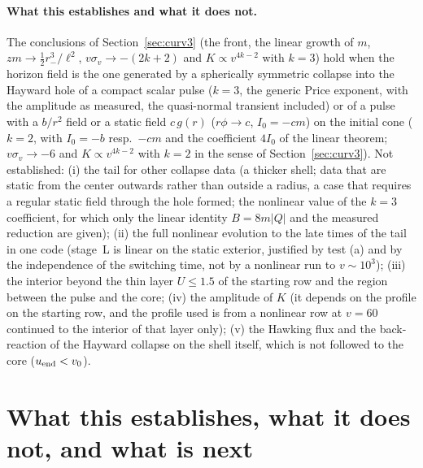 \documentclass[11pt]{article}
\begin{document}
\paragraph{What this establishes and what it does not.} The conclusions of Section~\ref{sec:curv3} (the front, the linear growth of $m$, $zm\to\tfrac12r_-^{3}/\ell^{2}$, $v\sigma_v\to-(2k+2)$ and $K\propto v^{4k-2}$ with $k=3$) hold when the horizon field is the one generated by a spherically symmetric collapse into the Hayward hole of a compact scalar pulse ($k=3$, the generic Price exponent, with the amplitude as measured, the quasi-normal transient included) or of a pulse with a $b/r^{2}$ field or a static field $c\,g(r)$ ($r\phi\to c$, $I_0=-cm$) on the initial cone ($k=2$, with $I_0=-b$ resp.\ $-cm$ and the coefficient $4I_0$ of the linear theorem; $v\sigma_v\to-6$ and $K\propto v^{4k-2}$ with $k=2$ in the sense of Section~\ref{sec:curv3}). Not established: (i) the tail for other collapse data (a thicker shell; data that are static from the center outwards rather than outside a radius, a case that requires a regular static field through the hole formed; the nonlinear value of the $k=3$ coefficient, for which only the linear identity $B=8m|Q|$ and the measured reduction are given); (ii) the full nonlinear evolution to the late times of the tail in one code (stage~L is linear on the static exterior, justified by test (a) and by the independence of the switching time, not by a nonlinear run to $v\sim10^{3}$); (iii) the interior beyond the thin layer $U\le1.5$ of the starting row and the region between the pulse and the core; (iv) the amplitude of $K$ (it depends on the profile on the starting row, and the profile used is from a nonlinear row at $v=60$ continued to the interior of that layer only); (v) the Hawking flux and the back-reaction of the Hayward collapse on the shell itself, which is not followed to the core ($u_{\rm end}<v_0$).

\section{What this establishes, what it does not, and what is next}
\label{sec:open}
\end{document}
